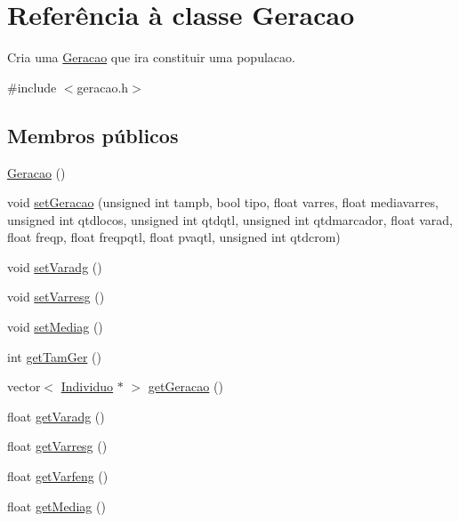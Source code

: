 \hypertarget{class_geracao}{\section{\-Referência à classe \-Geracao}
\label{class_geracao}
}


\-Cria uma \hyperlink{class_geracao}{\-Geracao} que ira constituir uma populacao.  




{\ttfamily \#include $<$geracao.\-h$>$}

\subsection*{\-Membros públicos}
\begin{DoxyCompactItemize}
\item 
\hyperlink{class_geracao_a52622873ac80a7d688e827b7430f7fe1}{\-Geracao} ()
\item 
void \hyperlink{class_geracao_ad06d071bed257d62506aa47a5186496f}{set\-Geracao} (unsigned int tampb, bool tipo, float varres, float mediavarres, unsigned int qtdlocos, unsigned int qtdqtl, unsigned int qtdmarcador, float varad, float freqp, float freqpqtl, float pvaqtl, unsigned int qtdcrom)
\item 
void \hyperlink{class_geracao_affc43315799b830a85c176072c5607ae}{set\-Varadg} ()
\item 
void \hyperlink{class_geracao_a8b139af5fcd3e5c5b302720cd6cabea0}{set\-Varresg} ()
\item 
void \hyperlink{class_geracao_adc9964b180ec37ecf40ba517a88f2c55}{set\-Mediag} ()
\item 
int \hyperlink{class_geracao_a58da88c6b6153dffd868cce13cade519}{get\-Tam\-Ger} ()
\item 
vector$<$ \hyperlink{class_individuo}{\-Individuo} $\ast$ $>$ \hyperlink{class_geracao_a313a62ad95ce1050c172954966bb83dd}{get\-Geracao} ()
\item 
float \hyperlink{class_geracao_a26583f8146e5f3e17f599a29646cc308}{get\-Varadg} ()
\item 
float \hyperlink{class_geracao_abda536f06142339a57e0b44ec52c0af1}{get\-Varresg} ()
\item 
float \hyperlink{class_geracao_a3ba1a1b0f86c1639af46e68263aa09c2}{get\-Varfeng} ()
\item 
float \hyperlink{class_geracao_a236ba45bf2ebe94e5d535e9e98bfa6a7}{get\-Mediag} ()
\end{DoxyCompactItemize}


